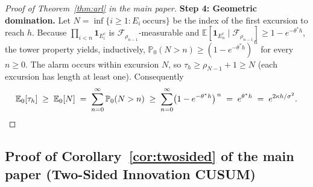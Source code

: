 \documentclass[bj,authoryear]{imsart}
\theoremstyle{plain}
\theoremstyle{definition}
\newcommand{\E}{\mathbb{E}}
\newcommand{\Prob}{\mathbb{P}}
\newcommand{\F}{\mathcal{F}}
\newcommand{\given}{\mid}
\begin{document}
\begin{proof}[Proof of Theorem~\ref{thm:arl} in the main paper]
  \textbf{Step 4: Geometric domination.}
  Let $N=\inf\{i\geq1:E_i\ \text{occurs}\}$ be the index of the first excursion
  to reach $h$.  Because $\prod_{i<n}\mathbf 1_{E_i^c}$ is
  $\F_{\rho_{n-1}}$-measurable and
  $\E[\mathbf 1_{E_n^c}\given\F_{\rho_{n-1}}]\geq1-e^{-\theta^\ast h}$, the
  tower property yields, inductively,
  $\Prob_0(N>n)\geq(1-e^{-\theta^\ast h})^{\,n}$ for every $n\geq0$.  The alarm
  occurs within excursion $N$, so $\tau_h\geq\rho_{N-1}+1\geq N$ (each
  excursion has length at least one).  Consequently
  \[
    \E_0[\tau_h]\;\geq\;\E_0[N]
      \;=\;\sum_{n=0}^{\infty}\Prob_0(N>n)
      \;\geq\;\sum_{n=0}^{\infty}\bigl(1-e^{-\theta^\ast h}\bigr)^{\,n}
      \;=\;e^{\theta^\ast h}\;=\;e^{2\kappa h/\sigma^2}. \qedhere
  \]
\end{proof}

\subsection{Proof of Corollary~\ref{cor:twosided} of the main paper (Two-Sided Innovation CUSUM)}
\label{app:proof-twosided}
\end{document}
